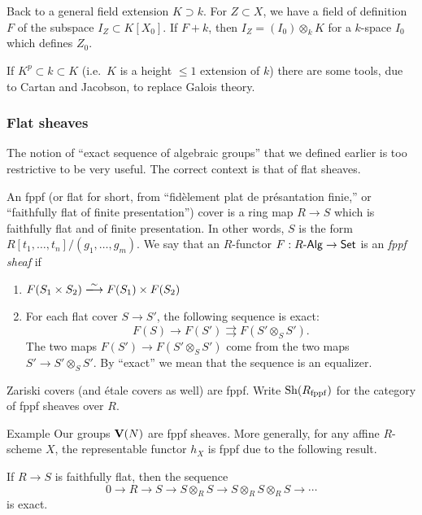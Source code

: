 Back to a general field extension $K\supset k$. For $Z\subset X$, we have 
a field of definition $F$ of the subspace $I_Z\subset K[X_0]$. If $F+k$, 
then $I_Z=(I_0)\otimes_k K$ for a $k$-space $I_0$ which defines $Z_0$. 

If $K^p\subset k\subset K$ (i.e.~$K$ is a height $\leqslant 1$ extension of 
$k$) there are some tools, due to Cartan and Jacobson, to replace Galois theory. 


\subsubsection{Flat sheaves}

The notion of ``exact sequence of algebraic groups'' that we defined earlier is 
too restrictive to be very useful. The correct context is that of flat 
sheaves. 


An fppf (or flat for short, from ``fid\`element plat de pr\'esantation finie,'' or 
``faithfully flat of finite presentation'') cover is a ring map $R\to S$ which 
is faithfully flat and of finite presentation. In other words, $S$ is the 
form $R[t_1,\dots,t_n] / (g_1,\dots,g_m)$. We say that an $R$-functor 
$F:R\text{-}\mathsf{Alg}\to \mathsf{Set}$ is an \emph{fppf sheaf} if 
\begin{enumerate}
  \item $F(S_1\times S_2)\isomorphism F(S_1)\times F(S_2)$ 
  \item For each flat cover $S\to S'$, the following sequence is exact: 
    \[
      F(S) \to F(S') \rightrightarrows F(S'\otimes_S S') .
    \]
    The two maps $F(S') \to F(S'\otimes_S S')$ come from the two 
    maps $S'\to S'\otimes_S S'$. By ``exact'' we mean that the sequence is 
    an equalizer. 
\end{enumerate}

Zariski covers (and \'etale covers as well) are fppf. Write 
$\operatorname{Sh}(R_{\mathrm{fppf}})$ for the category of fppf sheaves over $R$. 

\begin{enonce}[remark]{Example}
Our groups $\mathbf{V}(N)$ are fppf sheaves. More generally, for any affine $R$-scheme 
$X$, the representable functor $h_X$ is fppf due to the following result. 
\end{enonce}

\begin{prop}[Grothendieck]
If $R\to S$ is faithfully flat, then the sequence 
\[
  0 \to R \to S \to S\otimes_R S \to S\otimes_R S \otimes_R S \to \cdots
\]
is exact. 
\end{prop}

